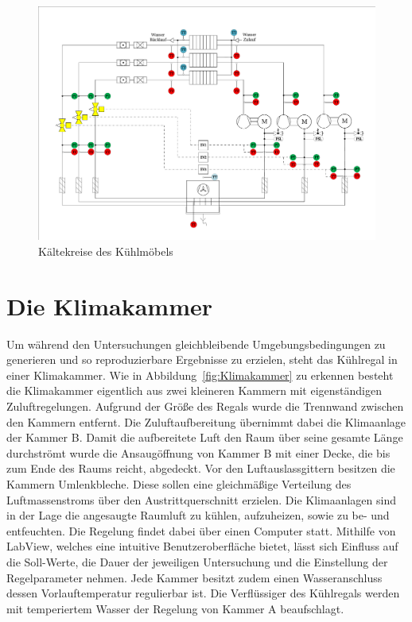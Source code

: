 \begin{figure} %
\centering
\includegraphics[scale=.5,angle=90]{Pictures/IDC150.pdf}
\caption{Kältekreise des Kühlmöbels}
\label{fig:IDC150}
\end{figure}


\section{Die Klimakammer}
\label{sec:Die Klimakammer}

Um während den Untersuchungen gleichbleibende Umgebungsbedingungen zu generieren und so reproduzierbare Ergebnisse zu erzielen, steht das Kühlregal in einer Klimakammer.
Wie in Abbildung~\ref{fig:Klimakammer} zu erkennen besteht die Klimakammer eigentlich aus zwei kleineren Kammern mit eigenständigen Zuluftregelungen. Aufgrund der Größe des Regals wurde die Trennwand zwischen den Kammern entfernt. Die Zuluftaufbereitung übernimmt dabei die Klimaanlage der Kammer B. Damit die aufbereitete Luft den Raum über seine gesamte Länge durchströmt wurde die Ansaugöffnung von Kammer B mit einer Decke, die bis zum Ende des Raums reicht, abgedeckt. Vor den Luftauslassgittern besitzen die Kammern Umlenkbleche. Diese sollen eine gleichmäßige Verteilung des Luftmassenstroms über den Austrittquerschnitt erzielen. Die Klimaanlagen sind in der Lage die angesaugte Raumluft zu kühlen, aufzuheizen, sowie zu be- und entfeuchten. Die Regelung findet dabei über einen Computer statt. Mithilfe von LabView, welches eine intuitive Benutzeroberfläche bietet, lässt sich Einfluss auf die Soll-Werte, die Dauer der jeweiligen Untersuchung und die Einstellung der Regelparameter nehmen. 
Jede Kammer besitzt zudem einen Wasseranschluss dessen Vorlauftemperatur regulierbar ist.
Die Verflüssiger des Kühlregals werden mit temperiertem Wasser der Regelung von Kammer A beaufschlagt. 


